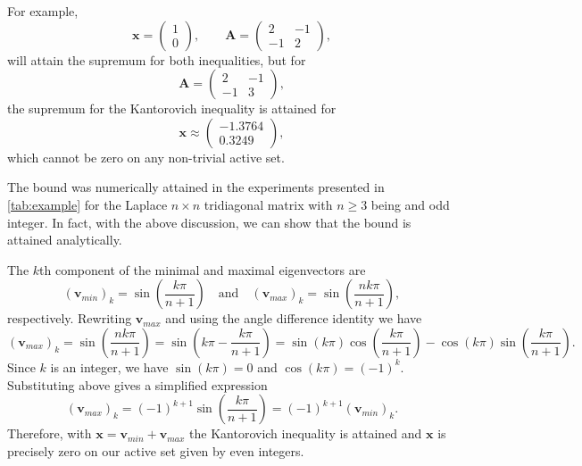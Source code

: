 \documentclass[11pt]{article}
\theoremstyle{plain}
\theoremstyle{definition}
\newcommand{\Vv}{\bm{v}}
\newcommand{\Vx}{\bm{x}}
\newcommand{\MA}{\bm{A}}
\begin{document}
For example,
\begin{equation*}
  \Vx = \begin{pmatrix} 1 \\ 0 \end{pmatrix}, \qquad \MA = \begin{pmatrix} 2 & -1 \\ -1 & 2 \end{pmatrix},
\end{equation*}
will attain the supremum for both inequalities, but for
\begin{equation*}
\MA = \begin{pmatrix} 2 & -1 \\ -1 & 3 \end{pmatrix},
\end{equation*}
the supremum for the Kantorovich inequality is attained for
\begin{equation*}
  \Vx \approx \begin{pmatrix} -1.3764 \\ 0.3249 \end{pmatrix},
\end{equation*}
which cannot be zero on any non-trivial active set.

The bound was numerically attained in the experiments presented in \cref{tab:example} for the Laplace $n \times n$ tridiagonal matrix with $n \geq 3$ being and odd integer.
In fact, with the above discussion, we can show that the bound is attained analytically.

The $k$th component of the minimal and maximal eigenvectors are
\begin{equation*}
  \left( \Vv_{min} \right)_k = \sin\left( \frac{k\pi}{n+1} \right) \quad \text{and} \quad \left( \Vv_{max} \right)_k = \sin\left( \frac{nk\pi}{n+1} \right),
\end{equation*}
respectively. Rewriting $\Vv_{max}$ and using the angle difference identity we have
\begin{equation*}
  \left( \Vv_{max} \right)_k = \sin\left( \frac{nk\pi}{n+1} \right) = \sin\left( k\pi - \frac{k\pi}{n+1} \right)
  = \sin\left( k\pi \right) \cos\left( \frac{k\pi}{n+1} \right) - \cos\left( k\pi \right) \sin\left( \frac{k\pi}{n+1} \right).
\end{equation*}
Since $k$ is an integer, we have $\sin\left( k\pi \right) = 0$ and $\cos\left( k\pi \right) = \left( -1 \right) ^{k}$. Substituting above gives a simplified expression
\begin{equation*}
  \left( \Vv_{max} \right)_k = (-1)^{k+1} \sin\left( \frac{k\pi}{n+1} \right) = (-1)^{k+1} \left( \Vv_{min} \right)_k.
\end{equation*}
Therefore, with $\Vx = \Vv_{min} + \Vv_{max}$ the Kantorovich inequality is attained and $\Vx$ is precisely zero on our active set given by even integers.
\end{document}
